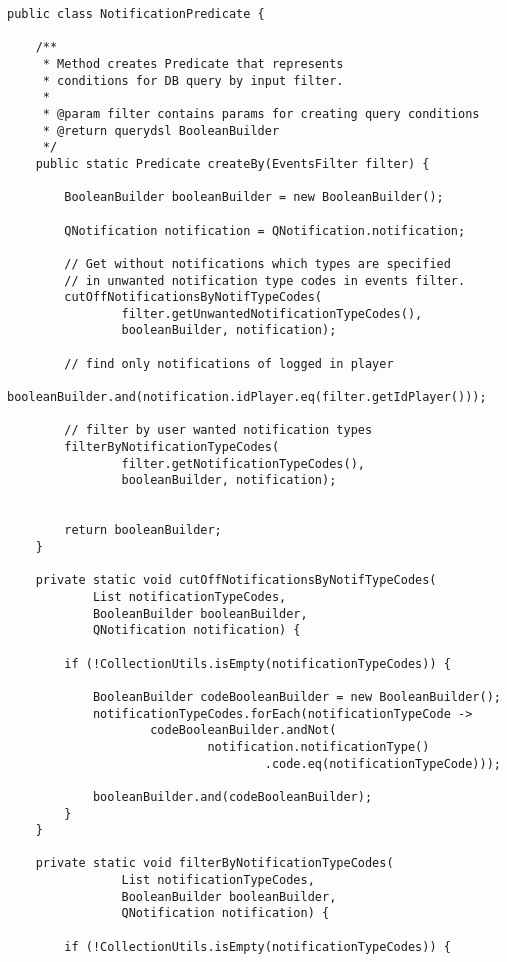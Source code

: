 \documentclass[twoside, 12pt]{article}
\begin{document}
{\clearpage

\begin{lstlisting}
public class NotificationPredicate {

    /**
     * Method creates Predicate that represents
     * conditions for DB query by input filter.
     *
     * @param filter contains params for creating query conditions
     * @return querydsl BooleanBuilder
     */
    public static Predicate createBy(EventsFilter filter) {

        BooleanBuilder booleanBuilder = new BooleanBuilder();

        QNotification notification = QNotification.notification;

        // Get without notifications which types are specified
        // in unwanted notification type codes in events filter.
        cutOffNotificationsByNotifTypeCodes(
                filter.getUnwantedNotificationTypeCodes(),
                booleanBuilder, notification);

        // find only notifications of logged in player
        booleanBuilder.and(notification.idPlayer.eq(filter.getIdPlayer()));

        // filter by user wanted notification types
        filterByNotificationTypeCodes(
                filter.getNotificationTypeCodes(),
                booleanBuilder, notification);


        return booleanBuilder;
    }

    private static void cutOffNotificationsByNotifTypeCodes(
            List notificationTypeCodes,
            BooleanBuilder booleanBuilder,
            QNotification notification) {

        if (!CollectionUtils.isEmpty(notificationTypeCodes)) {

            BooleanBuilder codeBooleanBuilder = new BooleanBuilder();
            notificationTypeCodes.forEach(notificationTypeCode ->
                    codeBooleanBuilder.andNot(
                            notification.notificationType()
                                    .code.eq(notificationTypeCode)));

            booleanBuilder.and(codeBooleanBuilder);
        }
    }

    private static void filterByNotificationTypeCodes(
                List notificationTypeCodes,
                BooleanBuilder booleanBuilder,
                QNotification notification) {

        if (!CollectionUtils.isEmpty(notificationTypeCodes)) {


\end{lstlisting}}
\end{document}
